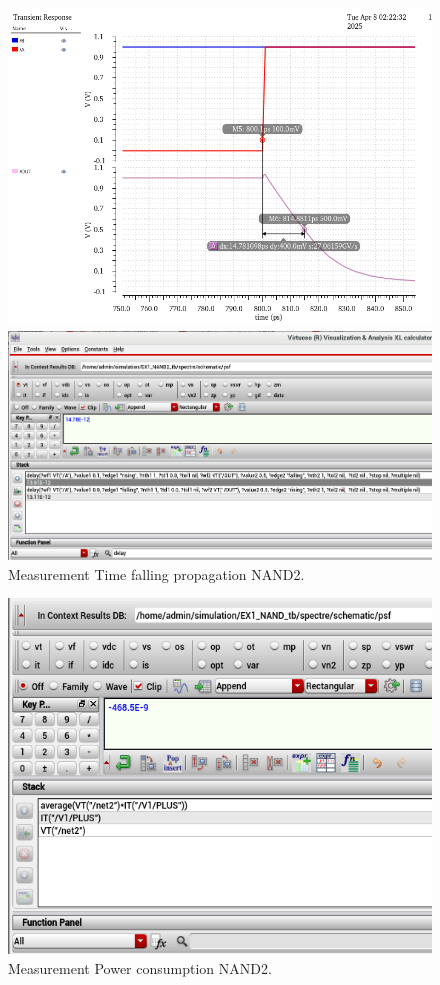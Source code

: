 \begin{figure}[H]
	\begin{minipage}{0.5\linewidth}
		\includegraphics[width=\linewidth]{section/EX1/NAND/EX1_NAND2_Tpdf_Waveform.png}
	\end{minipage}
	\begin{minipage}{0.5\linewidth}
		\includegraphics[width=\linewidth]{section/EX1/NAND/EX1_NAND2_Tpdf_Cal.png}
	\end{minipage}
	\caption{Measurement Time falling propagation NAND2.}
\end{figure}

\begin{figure}[H]
	\centering
	\includegraphics[width=.7\linewidth]{section/EX1/NAND/EX1_NAND2_Power.png}
	\caption{Measurement Power consumption NAND2.}
\end{figure}

